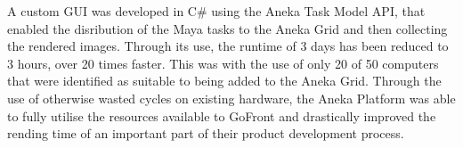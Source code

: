 A custom GUI was developed in C\# using the Aneka Task Model API, that enabled the disribution of the Maya tasks to the Aneka Grid and then collecting the rendered images. Through its use, the runtime of 3 days has been reduced to 3 hours, over 20 times faster. This was with the use of only 20 of 50 computers that were identified as suitable to being added to the Aneka Grid. Through the use of otherwise wasted cycles on existing hardware, the Aneka Platform was able to fully utilise the resources available to GoFront and drastically improved the rending time of an important part of their product development process.
